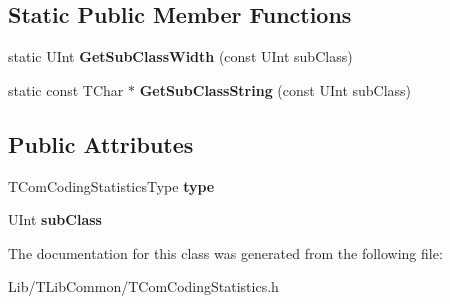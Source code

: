 \subsection*{Static Public Member Functions}
\begin{DoxyCompactItemize}
\item 
\mbox{\label{class_t_com_coding_statistics_class_type_a933cf310852ee3dccf9ea807f7c2b3c2}} 
static U\+Int {\bfseries Get\+Sub\+Class\+Width} (const U\+Int sub\+Class)
\item 
\mbox{\label{class_t_com_coding_statistics_class_type_a4fa6c763aec0cbf5c88023c69bc088bb}} 
static const T\+Char $\ast$ {\bfseries Get\+Sub\+Class\+String} (const U\+Int sub\+Class)
\end{DoxyCompactItemize}
\subsection*{Public Attributes}
\begin{DoxyCompactItemize}
\item 
\mbox{\label{class_t_com_coding_statistics_class_type_a0ab31c5c4f18782e3ccade671eec07c5}} 
T\+Com\+Coding\+Statistics\+Type {\bfseries type}
\item 
\mbox{\label{class_t_com_coding_statistics_class_type_a2cdf82b9e2adebe35d3c6631ec00cba7}} 
U\+Int {\bfseries sub\+Class}
\end{DoxyCompactItemize}


The documentation for this class was generated from the following file\+:\begin{DoxyCompactItemize}
\item 
Lib/\+T\+Lib\+Common/T\+Com\+Coding\+Statistics.\+h\end{DoxyCompactItemize}
